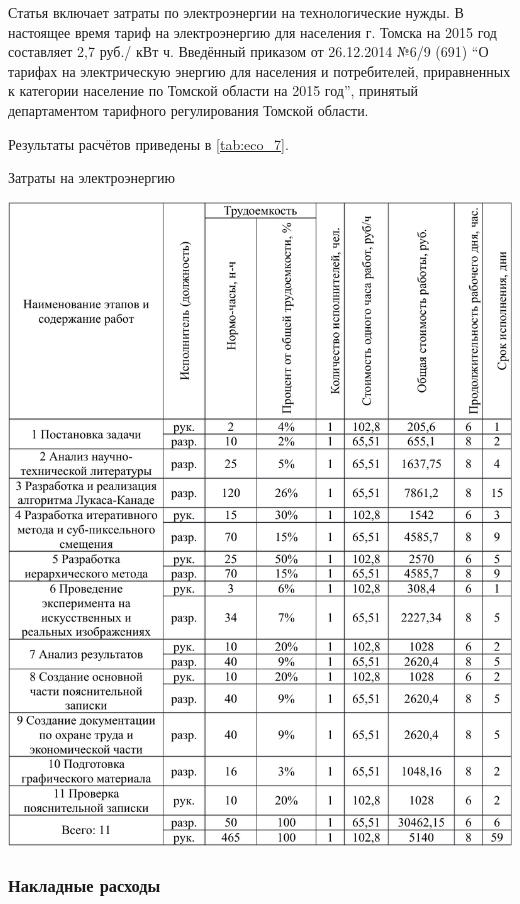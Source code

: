 Статья включает затраты по электроэнергии на технологические нужды. В настоящее время тариф на электроэнергию для населения г. Томска на 2015 год составляет 2,7 руб./ кВт ч. Введённый приказом от 26.12.2014 {\textquotedbl} №6/9 (691) ``О тарифах на электрическую энергию для населения и потребителей, приравненных к категории население по Томской области на 2015 год'', принятый департаментом тарифного регулирования Томской области.

Результаты расчётов приведены в \ref{tab:eco_7}.

\begin{table}[!ht]
\caption{Затраты на электроэнергию}
\centering
\includegraphics[page=7, width=1\linewidth]{econom_table.pdf}
\label{tab:eco_7}
\end{table}

\subsubsection{Накладные расходы}

